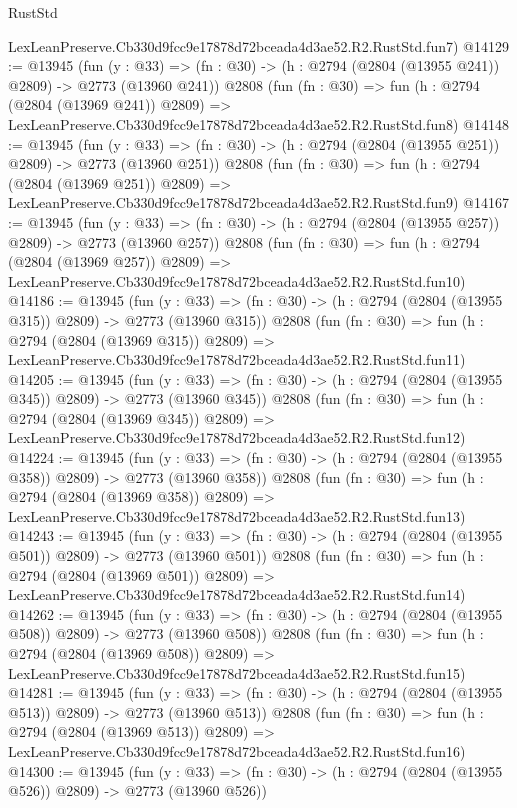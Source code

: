 \begin{lexlean}{RustStd}
\begin{coremodule}
    LexLeanPreserve.Cb330d9fcc9e17878d72bceada4d3ae52.R2.RustStd.fun7)
@14129 := @13945
    (fun (y : @33) => (fn : @30) -> (h : @2794 (@2804 (@13955 @241)) @2809) -> @2773 (@13960 @241))
    @2808
    (fun (fn : @30) =>
    fun (h : @2794 (@2804 (@13969 @241)) @2809) =>
    LexLeanPreserve.Cb330d9fcc9e17878d72bceada4d3ae52.R2.RustStd.fun8)
@14148 := @13945
    (fun (y : @33) => (fn : @30) -> (h : @2794 (@2804 (@13955 @251)) @2809) -> @2773 (@13960 @251))
    @2808
    (fun (fn : @30) =>
    fun (h : @2794 (@2804 (@13969 @251)) @2809) =>
    LexLeanPreserve.Cb330d9fcc9e17878d72bceada4d3ae52.R2.RustStd.fun9)
@14167 := @13945
    (fun (y : @33) => (fn : @30) -> (h : @2794 (@2804 (@13955 @257)) @2809) -> @2773 (@13960 @257))
    @2808
    (fun (fn : @30) =>
    fun (h : @2794 (@2804 (@13969 @257)) @2809) =>
    LexLeanPreserve.Cb330d9fcc9e17878d72bceada4d3ae52.R2.RustStd.fun10)
@14186 := @13945
    (fun (y : @33) => (fn : @30) -> (h : @2794 (@2804 (@13955 @315)) @2809) -> @2773 (@13960 @315))
    @2808
    (fun (fn : @30) =>
    fun (h : @2794 (@2804 (@13969 @315)) @2809) =>
    LexLeanPreserve.Cb330d9fcc9e17878d72bceada4d3ae52.R2.RustStd.fun11)
@14205 := @13945
    (fun (y : @33) => (fn : @30) -> (h : @2794 (@2804 (@13955 @345)) @2809) -> @2773 (@13960 @345))
    @2808
    (fun (fn : @30) =>
    fun (h : @2794 (@2804 (@13969 @345)) @2809) =>
    LexLeanPreserve.Cb330d9fcc9e17878d72bceada4d3ae52.R2.RustStd.fun12)
@14224 := @13945
    (fun (y : @33) => (fn : @30) -> (h : @2794 (@2804 (@13955 @358)) @2809) -> @2773 (@13960 @358))
    @2808
    (fun (fn : @30) =>
    fun (h : @2794 (@2804 (@13969 @358)) @2809) =>
    LexLeanPreserve.Cb330d9fcc9e17878d72bceada4d3ae52.R2.RustStd.fun13)
@14243 := @13945
    (fun (y : @33) => (fn : @30) -> (h : @2794 (@2804 (@13955 @501)) @2809) -> @2773 (@13960 @501))
    @2808
    (fun (fn : @30) =>
    fun (h : @2794 (@2804 (@13969 @501)) @2809) =>
    LexLeanPreserve.Cb330d9fcc9e17878d72bceada4d3ae52.R2.RustStd.fun14)
@14262 := @13945
    (fun (y : @33) => (fn : @30) -> (h : @2794 (@2804 (@13955 @508)) @2809) -> @2773 (@13960 @508))
    @2808
    (fun (fn : @30) =>
    fun (h : @2794 (@2804 (@13969 @508)) @2809) =>
    LexLeanPreserve.Cb330d9fcc9e17878d72bceada4d3ae52.R2.RustStd.fun15)
@14281 := @13945
    (fun (y : @33) => (fn : @30) -> (h : @2794 (@2804 (@13955 @513)) @2809) -> @2773 (@13960 @513))
    @2808
    (fun (fn : @30) =>
    fun (h : @2794 (@2804 (@13969 @513)) @2809) =>
    LexLeanPreserve.Cb330d9fcc9e17878d72bceada4d3ae52.R2.RustStd.fun16)
@14300 := @13945
    (fun (y : @33) => (fn : @30) -> (h : @2794 (@2804 (@13955 @526)) @2809) -> @2773 (@13960 @526))

\end{coremodule}
\end{lexlean}
